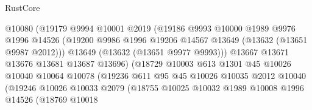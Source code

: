 \begin{lexlean}{RustCore}
\begin{coremodule}
                                  @10080
                                  (@19179
                                    @9994
                                    @10001
                                    @2019
                                    (@19186
                                      @9993
                                      @10000
                                      @1989
                                      @9976
                                      @1996
                                      @14526
                                      (@19200
                                        @9986
                                        @1996
                                        @19206
                                        @14567
                                        @13649
                                        (@13632 (@13651 @9987 @2012)))
                                      @13649
                                      (@13632 (@13651 @9977 @9993)))
                                    @13667
                                    @13671
                                    @13676
                                    @13681
                                    @13687
                                    @13696)
                                  (@18729
                                    @10003
                                    @613
                                    @1301
                                    @45
                                    @10026
                                    @10040
                                    @10064
                                    @10078
                                    (@19236
                                      @611
                                      @95
                                      @45
                                      @10026
                                      @10035
                                      @2012
                                      @10040
                                      (@19246
                                        @10026
                                        @10033
                                        @2079
                                        (@18755
                                          @10025
                                          @10032
                                          @1989
                                          @10008
                                          @1996
                                          @14526
                                          (@18769
                                            @10018

\end{coremodule}
\end{lexlean}
